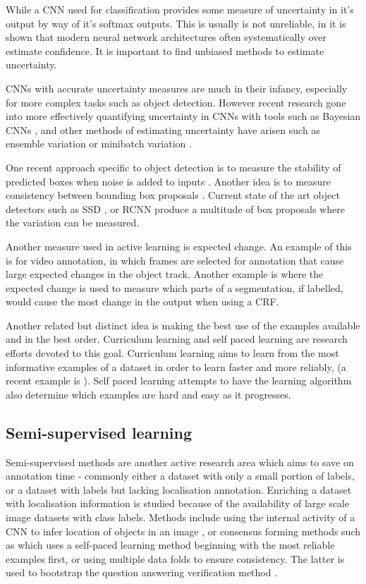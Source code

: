 While a \gls{CNN} used for classification provides some measure of uncertainty in it's output by way of it's softmax outputs. This is usually is not unreliable, in \cite{Guo2017} it is shown that modern neural network architectures often systematically over estimate confidence. It is important to find unbiased methods to estimate uncertainty.

\gls{CNN}s with accurate uncertainty measures are much in their infancy, especially for more complex tasks such as object detection. However recent research gone into more effectively quantifying uncertainty in \gls{CNN}s with tools such as Bayesian \gls{CNN}s \cite{Gal2017}, and other methods of estimating uncertainty have arisen such as ensemble variation \cite{Beluch2018} or minibatch variation \cite{Chang2017}. 

 One recent approach specific to object detection is to measure the stability of predicted boxes when noise is added to inputs \cite{Kao2018}. Another idea is to measure consistency between bounding box proposals \cite{Kao2018, Brust2018, Le2018}. Current state of the art object detectors such as \gls{SSD} \cite{Liu2016a}, or \gls{RCNN} \cite{Wang2017} produce a multitude of box proposals where the variation can be measured.

Another measure used in active learning is expected change. An example of this is \cite{Vondrick2011} for video annotation, in which frames are selected for annotation that cause large expected changes in the object track. Another example is \cite{Xu2017} where the expected change is used to measure which parts of a segmentation, if labelled, would cause the most change in the output when using a \gls{CRF}.

Another related but distinct idea is making the best use of the examples available and in the best order. Curriculum learning and self paced learning \cite{Kumar2010} are research efforts devoted to this goal. Curriculum learning aims to learn from the most informative examples of a dataset in order to learn faster and more reliably, (a recent example is \cite{Katharopoulos2018}). Self paced learning attempts to have the learning algorithm also determine which examples are hard and easy as it progresses.


\subsection{Semi-supervised learning}

Semi-supervised methods are another active research area which aims to save on annotation time - commonly either a dataset with only a small portion of labels, or a dataset with labels but lacking localisation annotation. Enriching a dataset with localisation information is studied because of the availability of large scale image datasets with class labels. Methods include using the internal activity of a \gls{CNN} to infer location of objects in an image \cite{Sivic2015}, or consensus forming methods such as \cite{Sangineto} which uses a self-paced learning method beginning with the most reliable examples first, or \cite{Cinbis2017} using multiple data folds to ensure consistency. The latter is used to bootstrap the question answering verification method \cite{Papadopoulos2016}.

